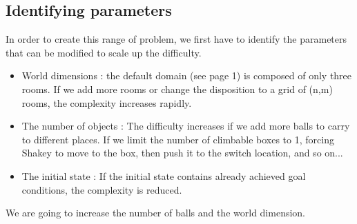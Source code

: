 \subsection*{Identifying parameters}
In order to create this range of problem, we first have to identify the
parameters that can be modified to scale up the difficulty.

\begin{itemize}
  \item World dimensions : the default domain (see page 1) is composed of only
three rooms. If we add more rooms or change the disposition to a grid of (n,m)
rooms, the complexity increases rapidly.
  \item The number of objects : The difficulty increases if we add more balls
to carry to different places. If we limit the number of climbable boxes to 1,
forcing Shakey to move to the box, then push it to the switch location, and so
on...
  \item The initial state : If the initial state contains already achieved goal
conditions, the complexity is reduced.
\end{itemize}

We are going to increase the number of balls and the world dimension.

